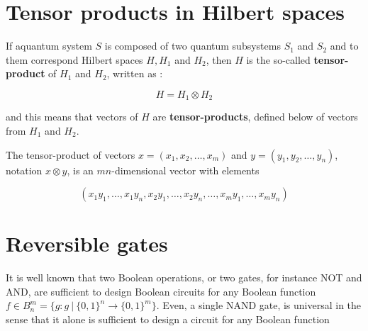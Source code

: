\documentclass[12pt]{book}
\begin{document}
\section{Tensor products in Hilbert spaces}


If aquantum system $S$ is composed of two quantum subsystems $S_{1}$
and $S_{2}$
and to them
correspond Hilbert spaces $H, H_{1}$
and $H_{2}$,
 then $H$ is the so-called \textbf{tensor-product} of $H_{1}$
and $H_{2}$, written as :

$$
H = H_{1} \otimes H_{2}
$$

and this means that vectors of $H$ are \textbf{tensor-products}, defined below of vectors from $H_{1}$
and $H_{2}$.


The tensor-product of vectors 
$x = (x_{1}, x_{2} , \dots , x_{m})$
and 
$y = (y_{1}, y_{2} , \dots , y_{n})$,
notation $x  \otimes y$,
is an $mn$-dimensional vector with elements

$$
(x_{1}y_{1},\dots, x_{1}y_{n},x_{2}y_{1} , \dots , x_{2}y_{n} , \dots , x_{m}y_{1}, \dots , x_{m}y_{n})
$$


\section{
Reversible gates
}

It is well known that two Boolean operations, or two gates, for 
instance NOT and AND,
are sufficient to design Boolean circuits for any Boolean 
function 
$f \in B_{n}^{m} = 
\{g : g \: | \: \{0,1\}^{n} \to  \{0,1\}^{m}\}
$.
Even, a single NAND gate,
is universal in the sense
that it alone is sufficient to design a circuit for any 
Boolean function

\end{document}
